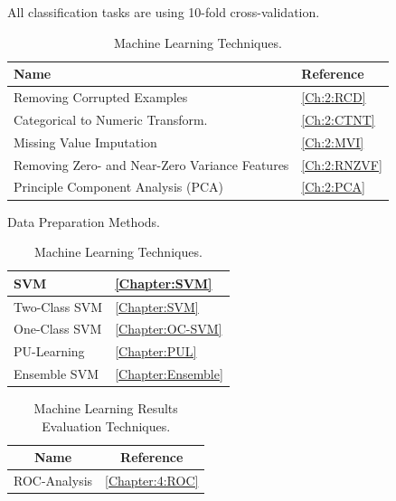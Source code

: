 All classification tasks are using 10-fold cross-validation. 


\begin{table}[ht!]
\centering
\setlength\tabcolsep{4pt}
\begin{minipage}{0.30\textwidth}
\centering
 \begin{tabular}{|l|l|}\hline
  Name&Reference\\ \hline
 Removing Corrupted Examples  & \ref{Ch:2:RCD} \\ \hline
        Categorical to Numeric Transform. & \ref{Ch:2:CTNT} \\
     \hline 
      Missing Value Imputation & \ref{Ch:2:MVI} \\
     \hline 
     
     Removing Zero- and Near-Zero Variance Features & \ref{Ch:2:RNZVF} \\
     \hline 

     Principle Component Analysis (PCA) & \ref{Ch:2:PCA} \\
     \hline 
        \end{tabular}
\caption{Data Preparation Methods.}
\label{tab:data-pred-methods} 
\end{minipage}%
\hfill
\begin{minipage}{0.24\textwidth}
\centering
 \begin{tabular}{|l|l|}\hline
         SVM & \ref{Chapter:SVM}\\
        \hline
        Two-Class SVM & \ref{Chapter:SVM} \\
        \hline
        One-Class SVM & \ref{Chapter:OC-SVM} \\
        \hline
        PU-Learning &  \ref{Chapter:PUL} \\
        \hline
        Ensemble SVM &  \ref{Chapter:Ensemble} \\
        \hline
        
    \end{tabular}
 \caption{Machine Learning Techniques.} 
 \label{tab:machine-learn-tech} 
\end{minipage}
\end{table}

\begin{table}[ht!]
    \begin{center}
    \caption{Machine Learning Results Evaluation Techniques.}
    \label{tab:res-ev}
        \begin{tabular}{|c|c|}
        \hline
        Name&Reference\\
        \hline
        ROC-Analysis & \ref{Chapter:4:ROC} \\
        \hline
        \end{tabular}
\end{center}
\end{table}




